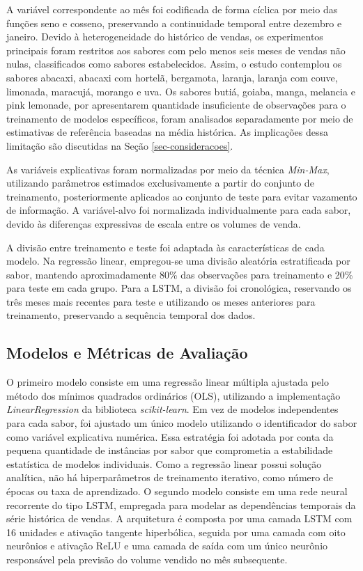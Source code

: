 A variável correspondente ao mês foi codificada de forma cíclica por meio das funções seno e cosseno, preservando a continuidade temporal entre dezembro e janeiro. Devido à heterogeneidade do histórico de vendas, os experimentos principais foram restritos aos sabores com pelo menos seis meses de vendas não nulas, classificados como sabores estabelecidos. Assim, o estudo contemplou os sabores abacaxi, abacaxi com hortelã, bergamota, laranja, laranja com couve, limonada, maracujá, morango e uva. Os sabores butiá, goiaba, manga, melancia e pink lemonade, por apresentarem quantidade insuficiente de observações para o treinamento de modelos específicos, foram analisados separadamente por meio de estimativas de referência baseadas na média histórica. As implicações dessa limitação são discutidas na Seção \ref{sec-consideracoes}.

As variáveis explicativas foram normalizadas por meio da técnica \textit{Min-Max}, utilizando parâmetros estimados exclusivamente a partir do conjunto de treinamento, posteriormente aplicados ao conjunto de teste para evitar vazamento de informação. A variável-alvo foi normalizada individualmente para cada sabor, devido às diferenças expressivas de escala entre os volumes de venda.

A divisão entre treinamento e teste foi adaptada às características de cada modelo. Na regressão linear, empregou-se uma divisão aleatória estratificada por sabor, mantendo aproximadamente 80\% das observações para treinamento e 20\% para teste em cada grupo. Para a LSTM, a divisão foi cronológica, reservando os três meses mais recentes para teste e utilizando os meses anteriores para treinamento, preservando a sequência temporal dos dados.

\subsection{Modelos e Métricas de Avaliação}

O primeiro modelo consiste em uma regressão linear múltipla ajustada pelo método dos mínimos quadrados ordinários (OLS), utilizando a implementação \textit{LinearRegression} da biblioteca \textit{scikit-learn}. Em vez de modelos independentes para cada sabor, foi ajustado um único modelo utilizando o identificador do sabor como variável explicativa numérica. Essa estratégia foi adotada por conta da pequena quantidade de instâncias por sabor que comprometia a estabilidade estatística de modelos individuais. Como a regressão linear possui solução analítica, não há hiperparâmetros de treinamento iterativo, como número de épocas ou taxa de aprendizado. O segundo modelo consiste em uma rede neural recorrente do tipo LSTM, empregada para modelar as dependências temporais da série histórica de vendas. A arquitetura é composta por uma camada LSTM com 16 unidades e ativação tangente hiperbólica, seguida por uma camada com oito neurônios e ativação ReLU e uma camada de saída com um único neurônio responsável pela previsão do volume vendido no mês subsequente.

